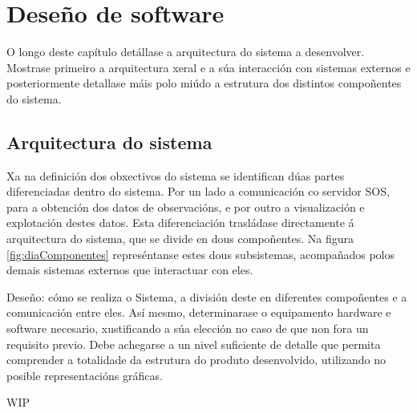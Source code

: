 \chapter{Deseño de software}
O longo deste capítulo detállase a arquitectura do sistema a desenvolver. Mostrase primeiro a arquitectura xeral e a súa interacción con sistemas externos e posteriormente detallase máis polo miúdo a estrutura dos distintos compoñentes do sistema.

\section{Arquitectura do sistema}
Xa na definición dos obxectivos do sistema se identifican dúas partes diferenciadas dentro do sistema. Por un lado a comunicación co servidor SOS, para a obtención dos datos de observacións, e por outro a visualización e explotación destes datos. Esta diferenciación trasládase directamente á arquitectura do sistema, que se divide en dous compoñentes. Na figura \ref{fig:diaComponentes} represéntanse estes dous subsistemas, acompañados polos demais sistemas externos que interactuar con eles. 

Deseño: cómo se realiza o Sistema, a división deste en diferentes compoñentes e a comunicación entre eles. Así mesmo, determinarase o equipamento hardware e software necesario, xustificando a súa elección no caso de que non fora un requisito previo. Debe achegarse a un nivel suficiente de detalle que permita comprender a totalidade da estrutura do produto desenvolvido, utilizando no  posible representacións gráficas.

WIP